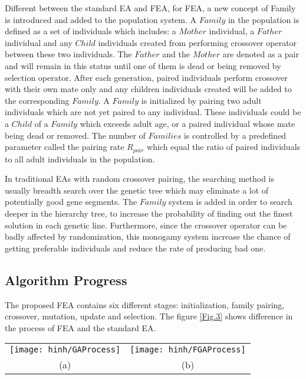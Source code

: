 \documentclass[final]{elsarticle}
\begin{document}
Different between the standard EA and FEA, for FEA, a new concept of Family is introduced and added to the population system. A $ Family $ in the population is defined as a set of individuals which includes: a $ Mother $ individual, a $ Father $ individual and any $ Child $ individuals created from performing crossover operator between these two individuals. The $ Father $ and the $ Mother $ are denoted as a pair and will remain in this status until one of them is dead or being removed by selection operator. After each generation, paired individuals perform crossover with their own mate only and any children individuals created will be added to the corresponding $ Family $. A $ Family $ is initialized by pairing two adult individuals which are not yet paired to any individual. These individuals could be a $ Child $ of a $ Family $ which exceeds adult age, or a paired individual whose mate being dead or removed. The number of $ Families $ is controlled by a predefined parameter called the pairing rate $R_{pair}$ which equal the ratio of paired individuals to all adult individuals in the population.

In traditional EAs with random crossover pairing, the searching method is usually breadth search over the genetic tree which may eliminate a lot of potentially good gene segments. The $ Family $ system is added in order to search deeper in the hierarchy tree, to increase the probability of finding out the finest solution in each genetic line. Furthermore, since the crossover operator can be badly affected by randomization, this monogamy system increase the chance of getting preferable individuals and reduce the rate of producing bad one. 


\subsection{Algorithm Progress}

The proposed FEA contains six different stages: initialization, family pairing, crossover, mutation, update and selection. The figure \ref{Fig.3} shows difference in the process of FEA and the standard EA.
\begin{figure*}[h]
	\begin{tabular}{cc}
		\texttt{[image: hinh/GAProcess]}&\texttt{[image: hinh/FGAProcess]}\\
		(a)  &(b) \\
	\end{tabular}
	\centering
	\caption{The algorithm process of EA (a) and FEA (b)
	}
	\label{Fig.3}       %
\end{figure*}
\end{document}
